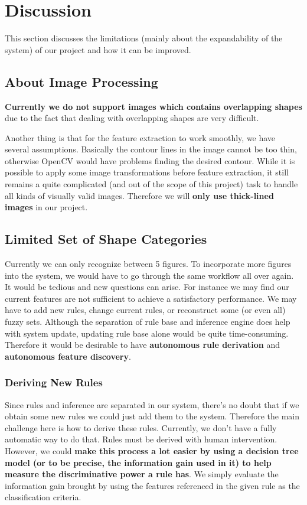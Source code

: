 \section{Discussion}

This section discusses the limitations (mainly about the expandability of the system) of our project and how it can be improved.

\subsection{About Image Processing}

\textbf{Currently we do not support images which contains overlapping shapes} due to the fact that dealing with overlapping shapes are very difficult.

Another thing is that for the feature extraction to work smoothly, we have several assumptions. Basically the contour lines in the image cannot be too thin, otherwise OpenCV would have problems finding the desired contour. While it is possible to apply some image transformations before feature extraction, it still remains a quite complicated (and out of the scope of this project) task to handle all kinds of visually valid images. Therefore we will \textbf{only use thick-lined images} in our project.

\subsection{Limited Set of Shape Categories}

Currently we can only recognize between 5 figures. To incorporate more figures into the system, we would have to go through the same workflow all over again. It would be tedious and new questions can arise. For instance we may find our current features are not sufficient to achieve a satisfactory performance. We may have to add new rules, change current rules, or reconstruct some (or even all) fuzzy sets. Although the separation of rule base and inference engine does help with system update, updating rule base alone would be quite time-consuming. Therefore it would be desirable to have \textbf{autonomous rule derivation} and \textbf{autonomous feature discovery}.

\subsubsection{Deriving New Rules}

Since rules and inference are separated in our system, there's no doubt that if we obtain some new rules we could just add them to the system. Therefore the main challenge here is how to derive these rules. Currently, we don't have a fully automatic way to do that. Rules must be derived with human intervention. However, we could \textbf{make this process a lot easier by using a decision tree model (or to be precise, the \textbf{information gain} used in it) to help measure the discriminative power a rule  has}. We simply evaluate the information gain brought by using the features referenced in the given rule as the classification criteria.

